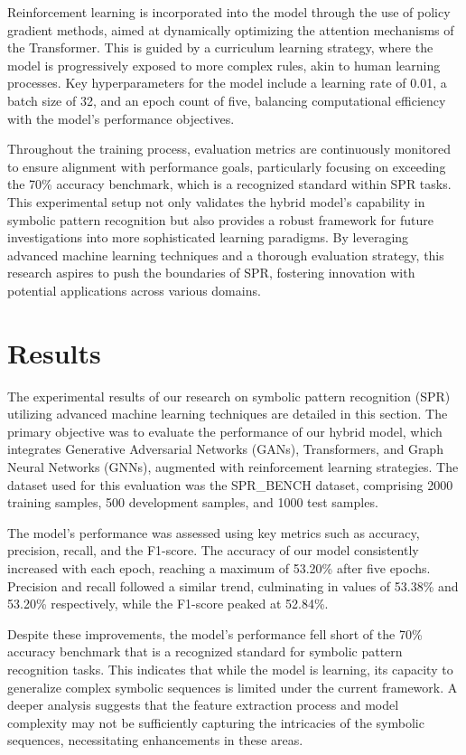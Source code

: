 \documentclass{article}
\begin{document}
Reinforcement learning is incorporated into the model through the use of policy gradient methods, aimed at dynamically optimizing the attention mechanisms of the Transformer. This is guided by a curriculum learning strategy, where the model is progressively exposed to more complex rules, akin to human learning processes. Key hyperparameters for the model include a learning rate of 0.01, a batch size of 32, and an epoch count of five, balancing computational efficiency with the model's performance objectives.

Throughout the training process, evaluation metrics are continuously monitored to ensure alignment with performance goals, particularly focusing on exceeding the 70\% accuracy benchmark, which is a recognized standard within SPR tasks. This experimental setup not only validates the hybrid model's capability in symbolic pattern recognition but also provides a robust framework for future investigations into more sophisticated learning paradigms. By leveraging advanced machine learning techniques and a thorough evaluation strategy, this research aspires to push the boundaries of SPR, fostering innovation with potential applications across various domains.

\section{Results}
The experimental results of our research on symbolic pattern recognition (SPR) utilizing advanced machine learning techniques are detailed in this section. The primary objective was to evaluate the performance of our hybrid model, which integrates Generative Adversarial Networks (GANs), Transformers, and Graph Neural Networks (GNNs), augmented with reinforcement learning strategies. The dataset used for this evaluation was the SPR\_BENCH dataset, comprising 2000 training samples, 500 development samples, and 1000 test samples.

The model's performance was assessed using key metrics such as accuracy, precision, recall, and the F1-score. The accuracy of our model consistently increased with each epoch, reaching a maximum of 53.20\% after five epochs. Precision and recall followed a similar trend, culminating in values of 53.38\% and 53.20\% respectively, while the F1-score peaked at 52.84\%.

Despite these improvements, the model's performance fell short of the 70\% accuracy benchmark that is a recognized standard for symbolic pattern recognition tasks. This indicates that while the model is learning, its capacity to generalize complex symbolic sequences is limited under the current framework. A deeper analysis suggests that the feature extraction process and model complexity may not be sufficiently capturing the intricacies of the symbolic sequences, necessitating enhancements in these areas.
\end{document}
